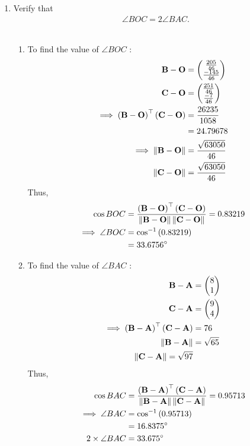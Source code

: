 \documentclass[10pt]{book}
\begin{document}
\begin{enumerate}[label=\thesection.\arabic*.,ref=\thesection.\theenumi]
\item Verify that 
\begin{align}
\angle BOC = 2\angle BAC.
\end{align}\\
 \solution
\begin{enumerate}
\item To find  the value of $\angle{BOC}$ :
\begin{align}
\mathbf{B}-\mathbf{O}
          &=\begin{pmatrix}\frac{205}{46}\\\frac{-145}{46}\end{pmatrix} \\
\mathbf{C}-\mathbf{O}
         & =\begin{pmatrix}\frac{251}{46}\\\frac{-7}{46}\end{pmatrix}
	  \\
\implies \left(\mathbf{B}-\mathbf{O}\right)^{\top}\left(\mathbf{C}-\mathbf{O}\right)&=\frac{26235}{1058}\\
        &= 24.79678\\
	\implies \left\lVert\mathbf{B}-\mathbf{O}\right\rVert&= \frac{\sqrt{63050}}{46} \\
	\left\lVert\mathbf{C}-\mathbf{O}\right\rVert &= \frac{\sqrt{63050}}{46}
\end{align}
Thus,
\begin{align}
\cos{BOC}&=\frac{\brak{\vec{B}-\vec{O}}^{\top}\brak{\vec{C}-\vec{O}}}{\norm{\vec{B}-\vec{O}}\norm{\vec{C}-\vec{O}}}
=0.83219\\
\implies\angle{BOC}&=\cos^{-1}\brak{0.83219}\\
&=33.6756\degree
\label{eq:1}
\end{align}
\item To find  the value of $\angle{BAC}$ :
\begin{align}
\mathbf{B}-\mathbf{A}&=\begin{pmatrix}8\\1\end{pmatrix} \\
\mathbf{C}-\mathbf{A}&=\begin{pmatrix}9\\4\end{pmatrix}\\
\implies \left(\mathbf{B}-\mathbf{A}\right)^{\top}\left(\mathbf{C}-\mathbf{A}\right)&=76\\
\left\lVert\mathbf{B}-\mathbf{A}\right\rVert&= \sqrt{65}\\
\left\lVert\mathbf{C}-\mathbf{A}\right\rVert= \sqrt{97}
\end{align}
Thus,
\begin{align}
\cos{BAC}&=\frac{\brak{\vec{B}-\vec{A}}^{\top}\brak{\vec{C}-\vec{A}}}{\norm{\vec{B}-\vec{A}}\norm{\vec{C}-\vec{A}}}
=0.95713\\
\implies\angle{BAC}&=\cos^{-1}\brak{0.95713}\\
&=16.8375\degree 
\label{eq:2}  \\
2\times\angle{BAC} &= 33.675\degree

\end{align}
\end{enumerate}
\end{enumerate}
\end{document}
